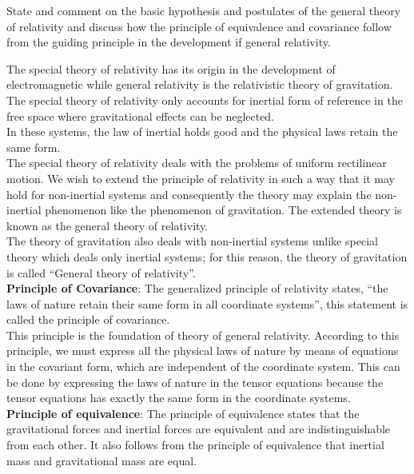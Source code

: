 \documentclass[../main-sheet.tex]{subfiles}
\begin{document}
        \begin{prob}
            State and comment on the basic hypothesis and postulates of the general theory of relativity and discuss how the principle of equivalence and covariance follow from the guiding principle in the development if general relativity.
        \end{prob}
        \begin{soln}
            The special theory of relativity has its origin in the development of electromagnetic while general relativity is the relativistic theory of gravitation. The special theory of relativity only accounts for inertial form of reference in the free space where gravitational effects can be neglected.\\
            In these systems, the law of inertial holds good and the physical laws retain the same form.\\
            The special theory of relativity deals with the problems of uniform rectilinear motion. We wish to extend the principle of relativity in such a way that it may hold for non-inertial systems and consequently the theory may explain the non-inertial phenomenon like the phenomenon of gravitation. The extended theory is known as the general theory of relativity.\\
            The theory of gravitation also deals with non-inertial systems unlike special theory which deals only inertial systems; for this reason, the theory of gravitation is called ``General theory of relativity''.\\

            \textbf{Principle of Covariance}: The generalized principle of relativity states, ``the laws of nature retain their same form in all coordinate systems'', this statement is called the principle of covariance.\\
            This principle is the foundation of theory of general relativity. According to this principle, we must express all the physical laws of nature by means of equations in the covariant form, which are independent of the coordinate system. This can be done by expressing the laws of nature in the tensor equations because the tensor equations has exactly the same form in the coordinate systems.\\


            \textbf{Principle of equivalence}: The principle of equivalence states that the gravitational forces and inertial forces are equivalent and are indistinguishable from each other. It also follows from the principle of equivalence that inertial mass and gravitational mass are equal.
        \end{soln}
\end{document}
